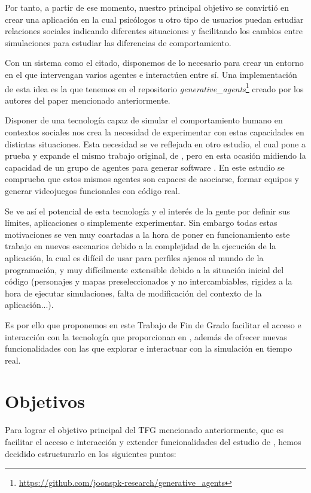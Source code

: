 Por tanto, a partir de ese momento, nuestro principal objetivo se convirtió en crear una aplicación en la cual psicólogos u otro tipo de usuarios puedan estudiar relaciones sociales indicando diferentes situaciones y facilitando los cambios entre simulaciones para estudiar las diferencias de comportamiento.

Con un sistema como el citado, disponemos de lo necesario para crear un entorno en el que intervengan varios agentes e interactúen entre sí. Una implementación de esta idea es la que tenemos en el repositorio {\textit{generative\_agents}}\footnote{\url{https://github.com/joonspk-research/generative_agents}} creado por los autores del paper mencionado anteriormente.

Disponer de una tecnología capaz de simular el comportamiento humano en contextos sociales nos crea la necesidad de experimentar con estas capacidades en distintas situaciones. Esta necesidad se ve reflejada en otro estudio, el cual pone a prueba y expande el mismo trabajo original, de \cite{park2023generative}, pero en esta ocasión midiendo la capacidad de un grupo de agentes para generar software \citep{qian2023communicative}. En este estudio se comprueba que estos mismos agentes son capaces de asociarse, formar equipos y generar videojuegos funcionales con código real.

Se ve así el potencial de esta tecnología y el interés de la gente por definir sus límites, aplicaciones o simplemente experimentar. Sin embargo todas estas motivaciones se ven muy coartadas a la hora de poner en funcionamiento este trabajo en nuevos escenarios debido a la complejidad de la ejecución de la aplicación, la cual es difícil de usar para perfiles ajenos al mundo de la programación, y muy difícilmente extensible debido a la situación inicial del código (personajes y mapas preseleccionados y no intercambiables, rigidez a la hora de ejecutar simulaciones, falta de modificación del contexto de la aplicación...).

Es por ello que proponemos en este Trabajo de Fin de Grado facilitar el acceso e interacción con la tecnología que proporcionan en \ga, además de ofrecer nuevas funcionalidades con las que explorar e interactuar con la simulación en tiempo real.

\section{Objetivos}

Para lograr el objetivo principal del TFG mencionado anteriormente, que es facilitar el acceso e interacción y extender funcionalidades del estudio de  \ga, hemos decidido estructurarlo en los siguientes puntos:

